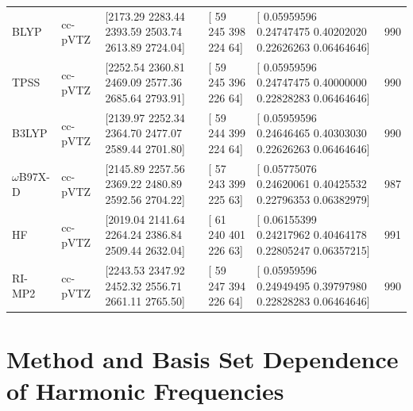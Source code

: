\begin{table}[h]
\begin{longtable}[]{@{}llllll@{}}
    BLYP & cc-pVTZ & {[}2173.29 2283.44 2393.59 2503.74 2613.89 2724.04{]} & {[} 59 245 398 224 64{]} & {[} 0.05959596 0.24747475 0.40202020 0.22626263 0.06464646{]} & 990\tabularnewline
    TPSS & cc-pVTZ & {[}2252.54 2360.81 2469.09 2577.36 2685.64 2793.91{]} & {[} 59 245 396 226 64{]} & {[} 0.05959596 0.24747475 0.40000000 0.22828283 0.06464646{]} & 990\tabularnewline
    B3LYP & cc-pVTZ & {[}2139.97 2252.34 2364.70 2477.07 2589.44 2701.80{]} & {[} 59 244 399 224 64{]} & {[} 0.05959596 0.24646465 0.40303030 0.22626263 0.06464646{]} & 990\tabularnewline
    \(\omega\)B97X-D & cc-pVTZ & {[}2145.89 2257.56 2369.22 2480.89 2592.56 2704.22{]} & {[} 57 243 399 225 63{]} & {[} 0.05775076 0.24620061 0.40425532 0.22796353 0.06382979{]} & 987\tabularnewline
    HF & cc-pVTZ & {[}2019.04 2141.64 2264.24 2386.84 2509.44 2632.04{]} & {[} 61 240 401 226 63{]} & {[} 0.06155399 0.24217962 0.40464178 0.22805247 0.06357215{]} & 991\tabularnewline
    RI-MP2 & cc-pVTZ & {[}2243.53 2347.92 2452.32 2556.71 2661.11 2765.50{]} & {[} 59 247 394 226 64{]} & {[} 0.05959596 0.24949495 0.39797980 0.22828283 0.06464646{]} & 990\tabularnewline
    \bottomrule
  \end{longtable}
\end{table}

\section{Method and Basis Set Dependence of Harmonic Frequencies}
\label{paper_02:sec:SIII}

